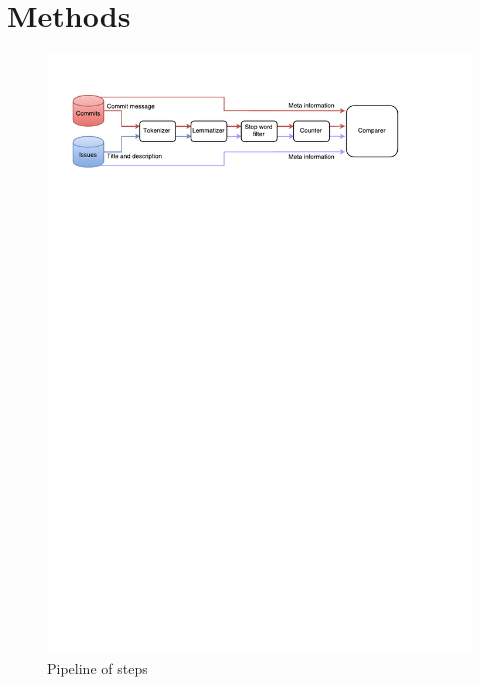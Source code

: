 \section{Methods}
\label{sec:methods}

\begin{figure}[t]
  \centering
  \includegraphics[width=\textwidth,trim={0 24cm 0 0},clip]{images/methods_vis.pdf}
  \caption{Pipeline of steps}
  \label{fig:methods_vis}
\end{figure}


